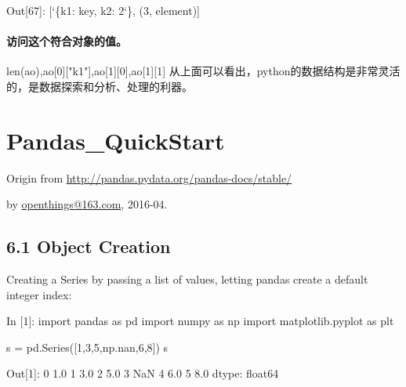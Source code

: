\documentclass[letterpaper,10pt,english]{sphinxmanual}
\def\PYGZob{\char`\{}
\def\PYGZcb{\char`\}}
\def\PYGZsq{\char`\'}
\renewcommand\PYGZsq{\textquotesingle}
\begin{document}
\begin{OriginalVerbatim}[commandchars=\\\{\}]
\textcolor{nbsphinxout}{Out[67]: }[\PYGZob{}\PYGZsq{}k1\PYGZsq{}: \PYGZsq{}key\PYGZsq{}, \PYGZsq{}k2\PYGZsq{}: 2\PYGZcb{}, (3, \PYGZsq{}element\PYGZsq{})]
\end{OriginalVerbatim}


\paragraph{访问这个符合对象的值。}
\label{pystart_databasic:_u8bbf_u95ee_u8fd9_u4e2a_u7b26_u5408_u5bf9_u8c61_u7684_u503c_u3002}len(ao),ao[0]["k1"],ao[1][0],ao[1][1]
从上面可以看出，python的数据结构是非常灵活的，是数据探索和分析、处理的利器。


\section{Pandas\_QuickStart}
\label{pandas_quickstart:Pandas_QuickStart}\label{pandas_quickstart::doc}
\begin{DUlineblock}{0em}
\item[] Origin from \url{http://pandas.pydata.org/pandas-docs/stable/}
\item[] by
\href{http://my.oschina.net/u/2306127/blog?catalog=3420733}{openthings@163.com},
2016-04.
\end{DUlineblock}


\subsection{6.1 Object Creation}
\label{pandas_quickstart:6.1-Object-Creation}
Creating a Series by passing a list of values, letting pandas create a
default integer index:

\begin{OriginalVerbatim}[commandchars=\\\{\}]
\textcolor{nbsphinxin}{In [1]: }import pandas as pd
        import numpy as np
        import matplotlib.pyplot as plt
        
        s = pd.Series([1,3,5,np.nan,6,8])
        s
\end{OriginalVerbatim}

\begin{OriginalVerbatim}[commandchars=\\\{\}]
\textcolor{nbsphinxout}{Out[1]: }0    1.0
        1    3.0
        2    5.0
        3    NaN
        4    6.0
        5    8.0
        dtype: float64
\end{OriginalVerbatim}
\end{document}
